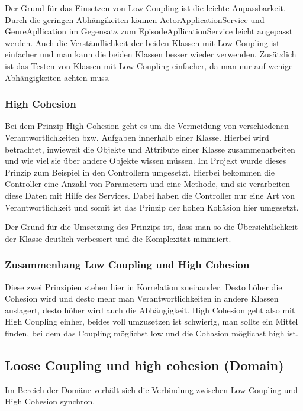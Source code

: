 			Der Grund für das Einsetzen von Low Coupling ist die leichte Anpassbarkeit. Durch die geringen Abhängikeiten können ActorApplicationService und GenreApllication im Gegensatz zum EpisodeApllicationService leicht angepasst werden. Auch die Verständlichkeit der beiden Klassen mit Low Coupling ist einfacher und man kann die beiden Klassen besser wieder verwenden. Zusätzlich ist das Testen von Klassen mit Low Coupling einfacher, da man nur auf wenige Abhängigkeiten achten muss.
		
		\subsubsection{High Cohesion}
			Bei dem Prinzip High Cohesion geht es um die Vermeidung von verschiedenen Verantwortlichkeiten bzw. Aufgaben innerhalb einer Klasse. Hierbei wird betrachtet, inwieweit die Objekte und Attribute einer Klasse zusammenarbeiten und wie viel sie über andere Objekte wissen müssen. Im Projekt wurde dieses Prinzip zum Beispiel in den Controllern umgesetzt. Hierbei bekommen die Controller eine Anzahl von Parametern und eine Methode, und sie verarbeiten diese Daten mit Hilfe des Services. Dabei haben die Controller nur eine Art von Verantwortlichkeit und somit ist das Prinzip der hohen Kohäsion hier umgesetzt.
			
			Der Grund für die Umsetzung des Prinzips ist, dass man so die Übersichtlichkeit der Klasse deutlich verbessert und die Komplexität minimiert.
			
		\subsubsection{Zusammenhang Low Coupling und High Cohesion}
		Diese zwei Prinzipien stehen hier in Korrelation zueinander. Desto höher die Cohesion wird und desto mehr man Verantwortlichkeiten in andere Klassen auslagert, desto höher wird auch die Abhängigkeit. High Cohesion geht also mit High Coupling einher, beides voll umzusetzen ist schwierig, man sollte ein Mittel finden, bei dem das Coupling möglichst low und die Cohasion möglichst high ist.
	
	\subsection{Loose Coupling und high cohesion (Domain)}
	Im Bereich der Domäne verhält sich die Verbindung zwischen Low Coupling und High Cohesion synchron.
	
